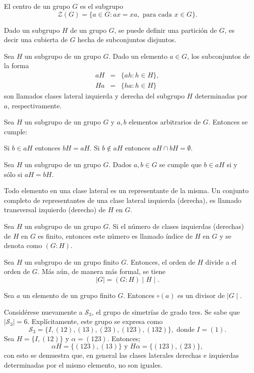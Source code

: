  \begin{definicion}
 El centro de un grupo $G$ es el subgrupo \[ \mathcal{Z}(G) = \{ a \in G \colon ax=xa, \mbox{ para cada }  x \in G \}. \]
\end{definicion}
Dado un subgrupo $H$ de un grupo $G$, se puede definir una partición de $G$, es decir una cubierta de $G$ hecha de subconjuntos disjuntos. 
\begin{definicion}
Sea $H$ un subgrupo de un grupo $G$. Dado un elemento $a \in G$, los subconjuntos de la forma 
\begin{eqnarray*}
aH &=& \{ ah \colon h \in H \}, \\
Ha &=& \{ ha \colon h \in H \} 
\end{eqnarray*}
son llamados clases lateral izquierda y derecha del subgrupo $H$ determinadas por $a$, respectivamente.
\end{definicion}
\newpage
\begin{proposicion}
Sea $H$ un subgrupo de un grupo $G$ y $a,b$ elementos arbitrarios de $G$. Entonces se cumple:
\begin{bulletList}
\newItem Si $b \in aH$ entonces $bH = aH$.
\newItem Si $b \notin aH$ entonces $aH \cap bH = \emptyset$.
\end{bulletList}
\end{proposicion}
\begin{corolario}
Sea $H$ un subgrupo de un grupo $G$. Dados $a,b \in G$ se cumple que $b \in aH$ si y sólo si $aH = bH$.
\end{corolario}
Todo elemento en una clase lateral es un representante de la misma. Un conjunto completo de representantes de una clase lateral izquierda (derecha), es llamado transversal izquierdo (derecho) de $H$ en $G$.
\begin{definicion}
Sea $H$ un subgrupo de un grupo $G$. Si el número de clases izquierdas (derechas) de $H$ en $G$ es finito, entonces este número es llamado  índice de $H$ en $G$ y se denota como $(G:H)$.
\end{definicion}
\begin{teorema}[Lagrange]
Sea $H$ un subgrupo de un grupo finito $G$. Entonces, el orden de $H$ divide a el orden de $G$. Más aún, de manera más formal, se tiene
\[ \mid G \mid = (G:H) \mid H \mid. \]
\end{teorema}
\begin{corolario}
Sea $a$ un elemento de un grupo finito $G$. Entonces $\circ(a)$ es un divisor de $\mid G \mid$.
\end{corolario}
\begin{ejemplo}
Considérese nuevamente a $\mathcal{S}_3$, el grupo de simetrías de grado tres. Se sabe que $|  \mathcal{S}_3 | = 6$. Explícitamente, este grupo se expresa como \[ \mathcal{S}_3 = \{ I, (12), (13), (23), (123), (132) \}, \mbox{ donde } I = (1) .\]
Sea $H = \{ I, (12) \} $ y $\alpha = (123)$. Entonces; \[ \alpha H = \{ (123), (13) \}   \mbox{ y } H\alpha = \{ (123), (23) \} ,\] con esto se demuestra que, en general las clases laterales derechas e izquierdas determinadas por el mismo elemento, no son iguales.
\end{ejemplo}

